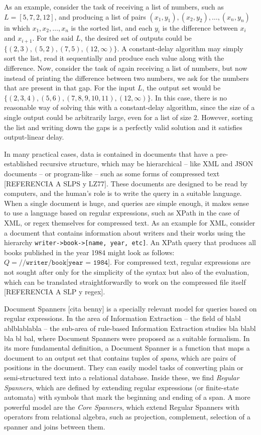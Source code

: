 As an example, consider the task of receiving a list of numbers, such as $L = [5, 7, 2, 12]$, and producing a list of pairs $(x_1,y_1),(x_2,y_2),\ldots,(x_n,y_n)$ in which $x_1,x_2,\ldots,x_n$ is the sorted list, and each $y_i$ is the difference between $x_i$ and $x_{i+1}$. For the said $L$, the desired set of outputs could be $\{(2,3), (5,2), (7,5),(12,\infty)\}$. A constant-delay algorithm may simply sort the list, read it sequentially and produce each value along with the difference. Now, consider the task of again receiving a list of numbers, but now instead of printing the difference between two numbers, we ask for the numbers that are present in that gap. For the input $L$, the output set would be $\{(2,3,4),(5,6),(7,8,9,10,11),(12,\infty)\}$. In this case, there is no reasonable way of solving this with a constant-delay algorithm, since the size of a single output could be arbitrarily large, even for a list of size 2. However, sorting the list and writing down the gaps is a perfectly valid solution and it satisfies output-linear delay.

In many practical cases, data is contained in documents that have a pre-established recursive structure, which may be hierarchical -- like XML and JSON documents -- or program-like -- such as some forms of compressed text [REFERENCIA A SLPS y LZ77]. These documents are designed to be read by computers, and the human's role is to write the query in a suitable language. When a single document is huge, and queries are simple enough, it makes sense to use a language based on regular expressions, such as XPath in the case of XML, or regex themselves for compressed text. As an example for XML, consider a document that contains information about writers and their works using the hierarchy {\tt writer->book->[name, year, etc]}. An XPath query that produces all books published in the year 1984 might look as follows: $Q = \texttt{//writer/book[year = 1984]}$. For compressed text, regular expressions are not sought after only for the simplicity of the syntax but also of the evaluation, which can be translated straightforwardly to work on the compressed file itself [REFERENCIA A SLP y regex].

Document Spanners [cita benny] is a specially relevant model for queries based on regular expressions. In the area of Information Extraction -- the field of blabl ablblablabla -- the sub-area of rule-based Information Extraction studies bla blabl bla bl bal, where Document Spanners were proposed as a suitable formalism.  In its more fundamental definition, a Document Spanner is a function that maps a document to an output set that contains tuples of {\it spans}, which are pairs of positions in the document. They can easily model tasks of converting plain or semi-structured text into a relational database. Inside these, we find {\it Regular Spanners}, which are defined by extending regular expressions (or finite-state automata) with symbols that mark the beginning and ending of a span. A more powerful model are the {\it Core Spanners}, which extend Regular Spanners with operators from relational algebra, such as projection, complement, selection of a spanner and joins between them. 

